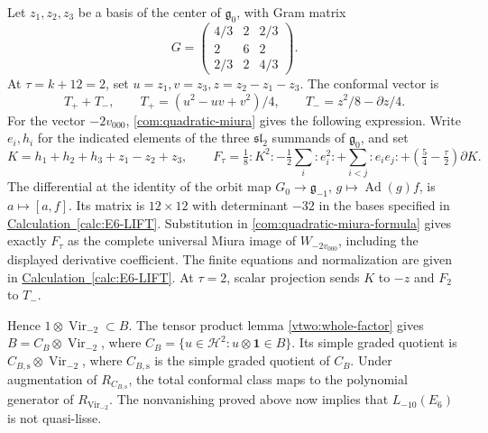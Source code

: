 \documentclass[11pt,a4paper]{amsart}
\numberwithin{equation}{section}
\theoremstyle{definition}
\theoremstyle{remark}
\newcommand{\g}{\mathfrak g}
\newcommand{\slg}{\mathfrak{sl}}
\newcommand{\Vir}{\operatorname{Vir}}
\begin{document}
Let $z_1,z_2,z_3$ be a basis of the center of $\g_0$, with Gram matrix
$$
 G=\begin{pmatrix}4/3&2&2/3\\2&6&2\\2/3&2&4/3\end{pmatrix}.
$$
At $\tau=k+12=2$, set $u=z_1,v=z_3,z=z_2-z_1-z_3$. The conformal vector is
$$
 T_++T_-,\qquad T_+=(u^2-uv+v^2)/4,\qquad
 T_-=z^2/8-\partial z/4.
$$
For the vector $-2v_{000}$, \cref{com:quadratic-miura} gives the
following expression. Write $e_i,h_i$ for the indicated elements of the
three $\slg_2$ summands of $\g_0$, and set
$$
 K=h_1+h_2+h_3+z_1-z_2+z_3,\qquad
 F_\tau=\tfrac18:K^2:-\tfrac12\sum_i:e_i^2:
       +\sum_{i<j}:e_ie_j:+(\tfrac54-\tfrac\tau2)\partial K.
$$
The differential at the identity of the orbit map $G_0\to\g_{-1}$,
$g\mapsto\operatorname{Ad}(g)f$, is $a\mapsto[a,f]$.
Its matrix is $12\times12$ with determinant $-32$
in the bases specified in
\hyperref[calc:E6-LIFT]{Calculation~\ref*{calc:E6-LIFT}}. Substitution in \eqref{com:quadratic-miura-formula} gives exactly
$F_\tau$ as the complete universal Miura image of $W_{-2v_{000}}$,
including the displayed derivative coefficient. The finite equations
and normalization are given in
\hyperref[calc:E6-LIFT]{Calculation~\ref*{calc:E6-LIFT}}.
At $\tau=2$, scalar projection sends $K$ to $-z$ and $F_2$ to $T_-$.

Hence $1\otimes\Vir_{-2}\subset B$. The tensor product lemma \cref{vtwo:whole-factor}
gives $B=C_B\otimes\Vir_{-2}$, where
$C_B=\{u\in\mathcal H^2:u\otimes\mathbf1\in B\}$.
Its simple graded quotient is $C_{B,\mathrm s}\otimes\Vir_{-2}$,
where $C_{B,\mathrm s}$ is the simple graded quotient of $C_B$.
Under augmentation of $R_{C_{B,\mathrm s}}$, the total conformal class
maps to the polynomial generator of $R_{\Vir_{-2}}$.
The nonvanishing proved above now implies that $L_{-10}(E_6)$ is not quasi-lisse.
\end{document}

